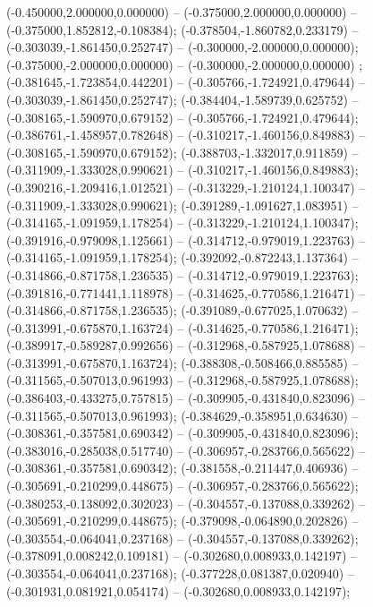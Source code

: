  (-0.450000,2.000000,0.000000) -- (-0.375000,2.000000,0.000000) -- (-0.375000,1.852812,-0.108384);
 (-0.378504,-1.860782,0.233179) -- (-0.303039,-1.861450,0.252747) -- (-0.300000,-2.000000,0.000000);
 (-0.375000,-2.000000,0.000000) -- (-0.300000,-2.000000,0.000000) ;
 (-0.381645,-1.723854,0.442201) -- (-0.305766,-1.724921,0.479644) -- (-0.303039,-1.861450,0.252747);
 (-0.384404,-1.589739,0.625752) -- (-0.308165,-1.590970,0.679152) -- (-0.305766,-1.724921,0.479644);
 (-0.386761,-1.458957,0.782648) -- (-0.310217,-1.460156,0.849883) -- (-0.308165,-1.590970,0.679152);
 (-0.388703,-1.332017,0.911859) -- (-0.311909,-1.333028,0.990621) -- (-0.310217,-1.460156,0.849883);
 (-0.390216,-1.209416,1.012521) -- (-0.313229,-1.210124,1.100347) -- (-0.311909,-1.333028,0.990621);
 (-0.391289,-1.091627,1.083951) -- (-0.314165,-1.091959,1.178254) -- (-0.313229,-1.210124,1.100347);
 (-0.391916,-0.979098,1.125661) -- (-0.314712,-0.979019,1.223763) -- (-0.314165,-1.091959,1.178254);
 (-0.392092,-0.872243,1.137364) -- (-0.314866,-0.871758,1.236535) -- (-0.314712,-0.979019,1.223763);
 (-0.391816,-0.771441,1.118978) -- (-0.314625,-0.770586,1.216471) -- (-0.314866,-0.871758,1.236535);
 (-0.391089,-0.677025,1.070632) -- (-0.313991,-0.675870,1.163724) -- (-0.314625,-0.770586,1.216471);
 (-0.389917,-0.589287,0.992656) -- (-0.312968,-0.587925,1.078688) -- (-0.313991,-0.675870,1.163724);
 (-0.388308,-0.508466,0.885585) -- (-0.311565,-0.507013,0.961993) -- (-0.312968,-0.587925,1.078688);
 (-0.386403,-0.433275,0.757815) -- (-0.309905,-0.431840,0.823096) -- (-0.311565,-0.507013,0.961993);
 (-0.384629,-0.358951,0.634630) -- (-0.308361,-0.357581,0.690342) -- (-0.309905,-0.431840,0.823096);
 (-0.383016,-0.285038,0.517740) -- (-0.306957,-0.283766,0.565622) -- (-0.308361,-0.357581,0.690342);
 (-0.381558,-0.211447,0.406936) -- (-0.305691,-0.210299,0.448675) -- (-0.306957,-0.283766,0.565622);
 (-0.380253,-0.138092,0.302023) -- (-0.304557,-0.137088,0.339262) -- (-0.305691,-0.210299,0.448675);
 (-0.379098,-0.064890,0.202826) -- (-0.303554,-0.064041,0.237168) -- (-0.304557,-0.137088,0.339262);
 (-0.378091,0.008242,0.109181) -- (-0.302680,0.008933,0.142197) -- (-0.303554,-0.064041,0.237168);
 (-0.377228,0.081387,0.020940) -- (-0.301931,0.081921,0.054174) -- (-0.302680,0.008933,0.142197);
